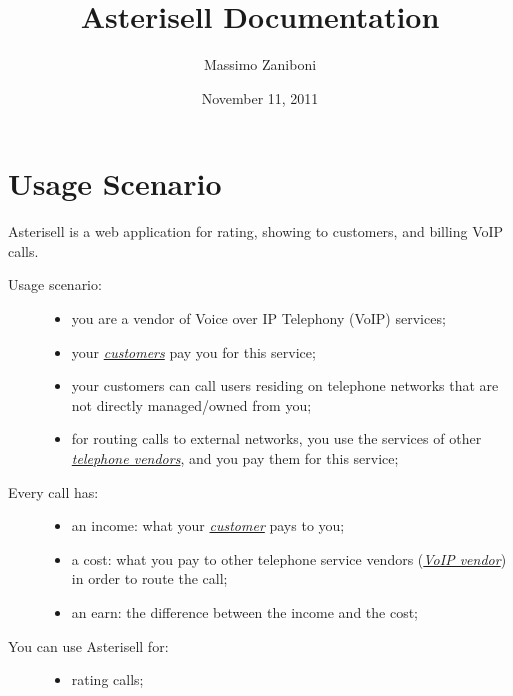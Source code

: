 \documentclass[letterpaper,10pt,english]{sphinxmanual}
\title{Asterisell Documentation}
\date{November 11, 2011}
\author{Massimo Zaniboni}
\begin{document}
\maketitle
\tableofcontents
{}\label{index::doc}



\chapter{Usage Scenario}
\label{index:asterisell-overview}\label{index:usage-scenario}
Asterisell is a web application for rating, showing to customers, and billing VoIP calls.
\begin{description}
\item[{Usage scenario:}] \leavevmode\begin{itemize}
\item {} 
you are a vendor of Voice over IP Telephony (VoIP) services;

\item {} 
your {\hyperref[index:term-customer]{\emph{customers}}} pay you for this service;

\item {} 
your customers can call users residing on telephone networks that are not directly managed/owned from you;

\item {} 
for routing calls to external networks, you use the services of other {\hyperref[index:term-voip-vendor]{\emph{telephone vendors}}}, and you pay them for this service;

\end{itemize}

\item[{Every call has:}] \leavevmode\begin{itemize}
\item {} 
an income: what your {\hyperref[index:term-customer]{\emph{customer}}} pays to you;

\item {} 
a cost: what you pay to other telephone service vendors ({\hyperref[index:term-voip-vendor]{\emph{VoIP vendor}}}) in order to route the call;

\item {} 
an earn: the difference between the income and the cost;

\end{itemize}

\item[{You can use Asterisell for:}] \leavevmode\begin{itemize}
\item {} 
rating calls;


\end{itemize}
\end{description}
\end{document}
